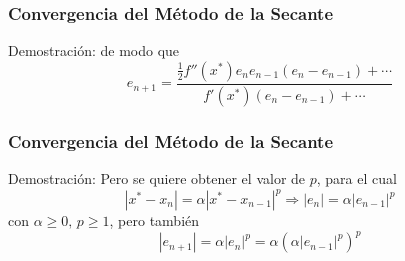 \documentclass{beamer}
\begin{document}
\begin{frame}
  \frametitle{Convergencia del M\'etodo de la Secante}
  \begin{block}{Demostraci\'on:}
    de modo que
    $$
    e_{n+1} = \frac{\frac{1}{2}f''(x^*)e_ne_{n-1}(e_n-e_{n-1}) + \cdots}{f'(x^*)(e_n - e_{n-1})+ \cdots}
    $$
  \end{block}
\end{frame}
\begin{frame}
  \frametitle{Convergencia del M\'etodo de la Secante}
  \begin{block}{Demostraci\'on:}
    Pero se quiere obtener el valor de $p$, para el cual
    $$
    |x^* - x_n| = \alpha|x^* - x_{n-1}|^p \Rightarrow |e_n| = \alpha|e_{n-1}|^p
    $$
con $\alpha \geq 0,\, p \geq 1$, pero tambi\'en
$$
|e_{n+1}| = \alpha|e_{n}|^p = \alpha\left(\alpha|e_{n-1}|^p\right)^p
$$
\vspace{-0.25cm}
  \end{block}
\end{frame}
\end{document}
